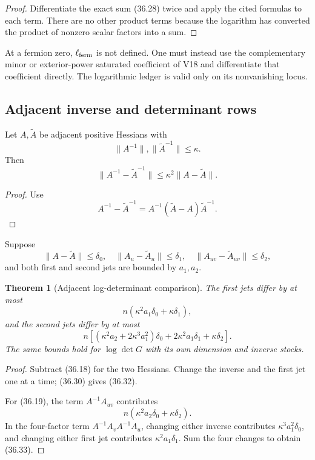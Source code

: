 \documentclass[11pt]{article}
\newtheorem{theorem}{Theorem}[section]
\begin{document}
\begin{proof}
Differentiate the exact sum (36.28) twice and apply the cited formulas
to each term.  There are no other product terms because the logarithm
has converted the product of nonzero scalar factors into a sum.
\end{proof}

At a fermion zero, \(\ell_{\rm ferm}\) is not defined.  One must instead
use the complementary minor or exterior-power saturated coefficient of
V18 and differentiate that coefficient directly.  The logarithmic
ledger is valid only on its nonvanishing locus.

\subsection{Adjacent inverse and determinant rows}

Let \(A,\widetilde A\) be adjacent positive Hessians with
\[
 \|A^{-1}\|,\|\widetilde A^{-1}\|\leq\kappa.
 \tag{36.29}
\]
Then
\[
 \|A^{-1}-\widetilde A^{-1}\|
 \leq\kappa^2\|A-\widetilde A\|.
 \tag{36.30}
\]

\begin{proof}
Use
\[
 A^{-1}-\widetilde A^{-1}
 =
 A^{-1}(\widetilde A-A)\widetilde A^{-1}.
\]
\end{proof}

Suppose
\[
 \|A-\widetilde A\|\leq\delta_0,\quad
 \|A_u-\widetilde A_u\|\leq\delta_1,\quad
 \|A_{uv}-\widetilde A_{uv}\|\leq\delta_2,
 \tag{36.31}
\]
and both first and second jets are bounded by \(a_1,a_2\).

\begin{theorem}[Adjacent log-determinant comparison]
\label{thm:v11v36-adjacent-logdet}
The first jets differ by at most
\[
 n(\kappa^2a_1\delta_0+\kappa\delta_1),
 \tag{36.32}
\]
and the second jets differ by at most
\[
 n\left[
 (\kappa^2a_2+2\kappa^3a_1^2)\delta_0
 +2\kappa^2a_1\delta_1
 +\kappa\delta_2
 \right].
 \tag{36.33}
\]
The same bounds hold for \(\log\det G\) with its own dimension and
inverse stocks.
\end{theorem}

\begin{proof}
Subtract (36.18) for the two Hessians.  Change the inverse and the first
jet one at a time; (36.30) gives (36.32).

For (36.19), the term \(A^{-1}A_{uv}\) contributes
\[
 n(\kappa^2a_2\delta_0+\kappa\delta_2).
\]
In the four-factor term \(A^{-1}A_vA^{-1}A_u\), changing either inverse
contributes \(\kappa^3a_1^2\delta_0\), and changing either first jet
contributes \(\kappa^2a_1\delta_1\).  Sum the four changes to obtain
(36.33).
\end{proof}
\end{document}
